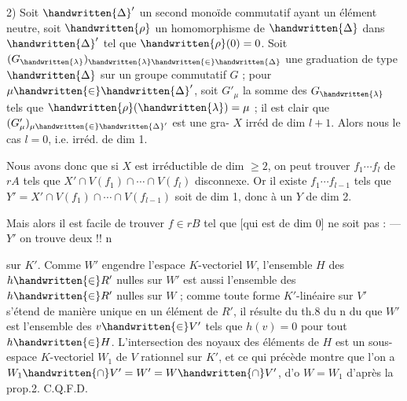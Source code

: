 2) Soit $\handwritten{\Delta}'$ un second monoïde commutatif ayant un élément neutre,  soit $\handwritten{\rho}$ un
homomorphisme de $\handwritten{\Delta}$ dans $\handwritten{\Delta}'$ tel que $\handwritten{\rho}(0)=0$. Soit $(G_{\handwritten{\lambda}})_{\handwritten{\lambda}\handwritten{\in}\handwritten{\Delta}}$ une graduation de type $\handwritten{\Delta}$ sur un groupe commutatif $G$ ; pour $\mu\handwritten{\in}\handwritten{\Delta}'$, soit $G'_\mu$ la
somme des $G_{\handwritten{\lambda}}$ tels que $\handwritten{\rho}(\handwritten{\lambda})=\mu$ ; il est clair que $(G'_\mu)_{\mu\handwritten{\in}\handwritten{\Delta}'}$ est une gra-
 $X$ irréd de dim $l+1$.
Alors nous 
le cas $l=0$,  i.e.  irréd. de dim 1.

Nous avons donc  que si $X$ est
irréductible de dim $\geq2$, on peut trouver
  $f_1\cdots f_l$ de $rA$ tels que
$X'\cap V(f_1)\cap\cdots\cap V(f_l)$ disconnexe. Or
il existe $f_1\cdots f_{l-1}$ tels que
$Y'=X'\cap V(f_1)\cap\cdots\cap V(f_{l-1})$ soit de dim 1,
donc  à un $Y$ de dim 2.

Mais alors il est facile de
trouver $f\in rB$ tel que   
[qui est de dim 0] ne soit pas
 :   --- 
$Y'$  on trouve deux  !!
\hfill n

sur $K'$. Comme $W'$ engendre l'espace $K$-vectoriel $W$, l'ensemble $H$ des $h\handwritten{\in}R'$
nulles sur $W'$ est aussi l'ensemble des $h\handwritten{\in}R'$ nulles sur $W$ ; comme toute
forme $K'$-linéaire sur $V'$ s'étend de manière unique en un élément de $R'$, il
résulte du th.8 du n du  que $W'$ est l'ensemble des $v\handwritten{\in}V'$ tels que
$h(v)=0$ pour tout $h\handwritten{\in}H$. L'intersection des noyaux des éléments de $H$ est
un sous-espace $K$-vectoriel $W_1$ de $V$ rationnel sur $K'$, et ce qui précède montre que l'on a $W_1\handwritten{\cap}V'=W'=W\handwritten{\cap}V'$, d'o $W=W_1$ d'après la prop.2. C.Q.F.D.

